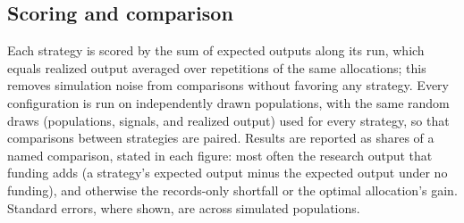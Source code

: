 \subsection*{Scoring and comparison}
Each strategy is scored by the sum of expected outputs along its run, which equals realized output averaged over repetitions of the same allocations; this removes simulation noise from comparisons without favoring any strategy. Every configuration is run on independently drawn populations, with the same random draws (populations, signals, and realized output) used for every strategy, so that comparisons between strategies are paired. Results are reported as shares of a named comparison, stated in each figure: most often the research output that funding adds (a strategy's expected output minus the expected output under no funding), and otherwise the records-only shortfall or the optimal allocation's gain. Standard errors, where shown, are across simulated populations.

